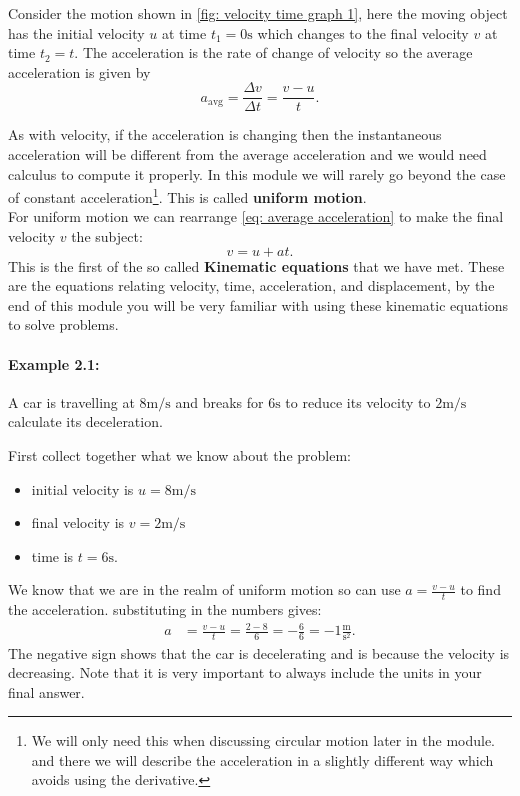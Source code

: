 Consider the motion shown in \cref{fig: velocity time graph 1}, here the moving object has the initial velocity $u$ at time $t_{1}=0\text{s}$ which changes to the final velocity $v$ at time $t_{2}=t$. The acceleration is the rate of change of velocity so the average acceleration is given by
\begin{equation}
    a_{\text{avg}}=\frac{\Delta v}{\Delta t}=\frac{v-u}{t}.
    \label{eq: average acceleration}
\end{equation}

As with velocity, if the acceleration is changing then the instantaneous acceleration will be different from the average acceleration and we would need calculus to compute it properly. In this module we will rarely go beyond the case of constant acceleration\footnote{We will only need this when discussing circular motion later in the module. and there we will describe the acceleration in a slightly different way which avoids using the derivative.}. This is called \textbf{uniform motion}.\\

For uniform motion we can rearrange \cref{eq: average acceleration} to make the final velocity $v$ the subject:
\begin{equation}
    v=u+at.
    \label{eq: Kinematic equation 1}
\end{equation}
This is the first of the so called \textbf{Kinematic equations} that we have met. These are the equations relating velocity, time, acceleration, and displacement, by the end of this module you will be very familiar with using these kinematic equations to solve problems. 

\paragraph{Example 2.1:} A car is travelling at $8\text{m/s}$ and breaks for $6\text{s}$  to reduce its velocity to $2\text{m/s}$ calculate its deceleration.

First collect together what we know about the problem:
\begin{itemize}
\setlength{\itemsep}{-5pt}
    \item initial velocity is $u=8\text{m/s}$
    \item final velocity is $v=2\text{m/s}$
    \item time is $t=6\text{s}$.
\end{itemize}
We know that we are in the realm of uniform motion so can use $a=\frac{v-u}{t}$ to find the acceleration. substituting in the numbers gives:
\begin{align*}
    a&=\frac{v-u}{t}=\frac{2-8}{6}=-\frac{6}{6}=-1\frac{\text{m}}{\text{s}^{2}}.
\end{align*}
The negative sign shows that the car is decelerating and is because the velocity is decreasing. Note that it is very important to always include the units in your final answer.\\

